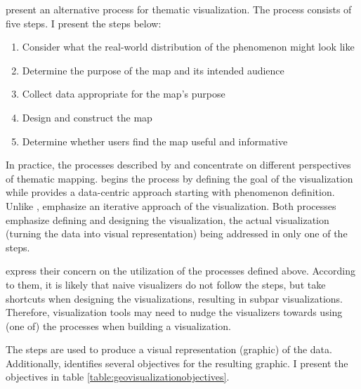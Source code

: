 \citet[chap.~1]{slocum_thematic_2014} present an alternative process for thematic visualization. The process consists of five steps. I present the steps below:

\begin{enumerate}
	\item Consider what the real-world distribution of the phenomenon might look like
	\item Determine the purpose of the map and its intended audience
	\item Collect data appropriate for the map's purpose
	\item Design and construct the map
	\item Determine whether users find the map useful and informative
\end{enumerate}

In practice, the processes described by \citeauthor{schlichtmann_visualization_2002} and \citeauthor{slocum_thematic_2014} concentrate on different perspectives of thematic mapping. \citeauthor{schlichtmann_visualization_2002} begins the process by defining the goal of the visualization while \citeauthor{slocum_thematic_2014} provides a data-centric approach starting with phenomenon definition. Unlike \citeauthor{schlichtmann_visualization_2002}, \citeauthor{slocum_thematic_2014} emphasize an iterative approach of the visualization. Both processes emphasize defining and designing the visualization, the actual visualization (turning the data into visual representation) being addressed in only one of the steps.

\citet[chap.~1]{slocum_thematic_2014} express their concern on the utilization of the processes defined above. According to them, it is likely that naive visualizers do not follow the steps, but take shortcuts when designing the visualizations, resulting in subpar visualizations. Therefore, visualization tools may need to nudge the visualizers towards using (one of) the processes when building a visualization.

The steps are used to produce a visual representation (graphic) of the data. Additionally, \citet{schlichtmann_visualization_2002} identifies several objectives for the resulting graphic. I present the objectives in table \ref{table:geovisualizationobjectives}.

